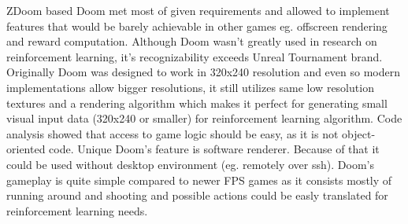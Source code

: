 ZDoom based Doom met most of given requirements and allowed to implement features that would be barely achievable in other games eg. offscreen rendering and reward computation.
Although Doom wasn't greatly used in research on reinforcement learning, it's recognizability exceeds Unreal Tournament brand.
Originally Doom was designed to work in 320x240 resolution and even so modern implementations allow bigger resolutions, it still utilizes same low resolution textures and a rendering algorithm which makes it perfect for generating small visual input data (320x240 or smaller) for reinforcement learning algorithm.
Code analysis showed that access to game logic should be easy, as it is not object-oriented code.
Unique Doom's feature is software renderer. Because of that it could be used without desktop environment (eg. remotely over ssh).
Doom's gameplay is quite simple compared to newer FPS games as it consists mostly of running around and shooting and possible actions could be easly translated for reinforcement learning needs. 
